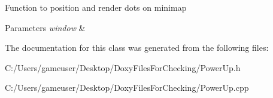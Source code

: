 Function to position and render dots on minimap 


\begin{DoxyParams}{Parameters}
{\em window} & \\
\hline
\end{DoxyParams}


The documentation for this class was generated from the following files\+:\begin{DoxyCompactItemize}
\item 
C\+:/\+Users/gameuser/\+Desktop/\+Doxy\+Files\+For\+Checking/Power\+Up.\+h\item 
C\+:/\+Users/gameuser/\+Desktop/\+Doxy\+Files\+For\+Checking/Power\+Up.\+cpp\end{DoxyCompactItemize}
